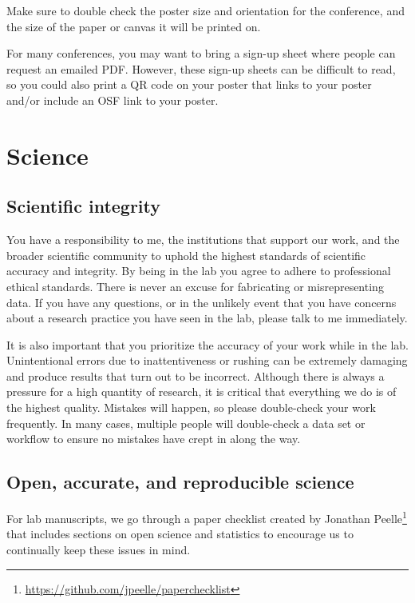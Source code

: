 \documentclass[letterpaper,12pt,oneside]{memoir}
\begin{document}
Make sure to double check the poster size and orientation for the conference, and the size of the paper or canvas it will be printed on.

For many conferences, you may want to bring a sign-up sheet where people can request an emailed PDF. However, these sign-up sheets can be difficult to read, so you could also print a QR code on your poster that links to your poster and/or include an OSF link to your poster.



\chapter{Science}

\section{Scientific integrity}

You have a responsibility to me, the institutions that support our work, and the broader scientific community to uphold the highest standards of scientific accuracy and integrity. By being in the lab you agree to adhere to professional ethical standards. There is never an excuse for fabricating or misrepresenting data. If you have any questions, or in the unlikely event that you have concerns about a research practice you have seen in the lab, please talk to me immediately.

It is also important that you prioritize the accuracy of your work while in the lab. Unintentional errors due to inattentiveness or rushing can be extremely damaging and produce results that turn out to be incorrect. Although there is always a pressure for a high quantity of research, it is critical that everything we do is of the highest quality. Mistakes will happen, so please double-check your work frequently. In many cases, multiple people will double-check a data set or workflow to ensure no mistakes have crept in along the way.


\section{Open, accurate, and reproducible science}
\label{sec:openscience}

For lab manuscripts, we go through a paper checklist created by Jonathan Peelle\footnote{\url{https://github.com/jpeelle/paperchecklist}} that includes sections on open science and statistics to encourage us to continually keep these issues in mind.
\end{document}
